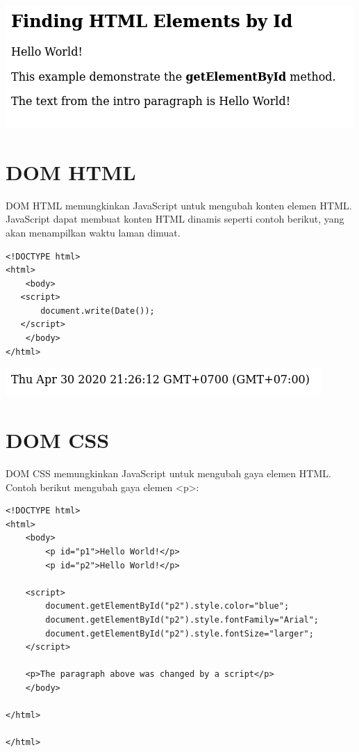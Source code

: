 \documentclass[a4paper,12pt]{article}
\begin{document}
\begin{center}
    \includegraphics[scale=.7]{2.png} 
\end{center}

\section*{DOM HTML}
DOM HTML memungkinkan JavaScript untuk mengubah konten elemen HTML. JavaScript dapat membuat konten HTML dinamis seperti
contoh berikut, yang akan menampilkan waktu laman dimuat.
\begin{lstlisting}
<!DOCTYPE html>
<html>
    <body>
   <script>
       document.write(Date());
   </script>
    </body>
</html>

\end{lstlisting}

\begin{center}
    \includegraphics[scale=.7]{3.png} 
\end{center}

\section*{DOM CSS}
DOM CSS memungkinkan JavaScript untuk mengubah gaya elemen HTML.
Contoh berikut mengubah gaya elemen <p>:
\begin{lstlisting}
<!DOCTYPE html>
<html>
    <body>
        <p id="p1">Hello World!</p>
        <p id="p2">Hello World!</p>

    <script>
        document.getElementById("p2").style.color="blue";
        document.getElementById("p2").style.fontFamily="Arial";
        document.getElementById("p2").style.fontSize="larger";
    </script>

    <p>The paragraph above was changed by a script</p>
    </body>

</html>

</html>
\end{lstlisting}
\end{document}
